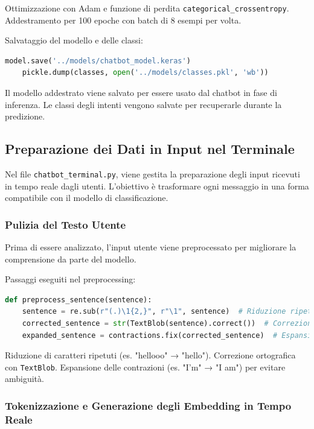 \documentclass[12pt, letterpaper]{article}
\begin{document}
Ottimizzazione con Adam e funzione di perdita \texttt{categorical\_crossentropy}. Addestramento per 100 epoche con batch di 8 esempi per volta.

Salvataggio del modello e delle classi:

\begin{lstlisting}[language=Python]
	model.save('../models/chatbot_model.keras')
	pickle.dump(classes, open('../models/classes.pkl', 'wb'))
\end{lstlisting}

Il modello addestrato viene salvato per essere usato dal chatbot in fase di inferenza. Le classi degli intenti vengono salvate per recuperarle durante la predizione.

\subsection{Preparazione dei Dati in Input nel Terminale}

Nel file \texttt{chatbot\_terminal.py}, viene gestita la preparazione degli input ricevuti in tempo reale dagli utenti. L'obiettivo è trasformare ogni messaggio in una forma compatibile con il modello di classificazione.

\subsubsection{Pulizia del Testo Utente}

Prima di essere analizzato, l'input utente viene preprocessato per migliorare la comprensione da parte del modello.

Passaggi eseguiti nel preprocessing:

\begin{lstlisting}[language=Python]
	def preprocess_sentence(sentence):
	sentence = re.sub(r"(.)\1{2,}", r"\1", sentence)  # Riduzione ripetizioni di caratteri
	corrected_sentence = str(TextBlob(sentence).correct())  # Correzione ortografica
	expanded_sentence = contractions.fix(corrected_sentence)  # Espansione delle contrazioni
\end{lstlisting}

Riduzione di caratteri ripetuti (es. "hellooo" → "hello"). Correzione ortografica con \texttt{TextBlob}. Espansione delle contrazioni (es. "I'm" → "I am") per evitare ambiguità.

\subsubsection{Tokenizzazione e Generazione degli Embedding in Tempo Reale}
\end{document}
